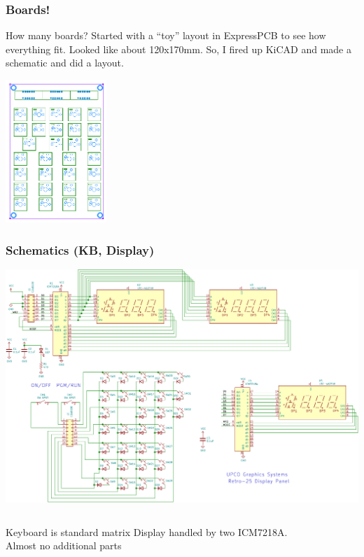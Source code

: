 \documentclass{beamer}
\newcommand{\tred}[1]{\textcolor{my-red}{#1}}
\newcommand{\tblue}[1]{\textcolor{my-blue}{#1}}
\begin{document}
\begin{frame}
  \frametitle{Boards!}

  \scriptsize
  How many boards?  Started with a ``toy'' layout in ExpressPCB to
  see how everything fit.  Looked like about 120x170mm.  So, I fired
  up KiCAD and made a schematic and did a layout.

  \vskip 0.15in

  \includegraphics[width=1.5in]{figs/sample_epcb.png}

\end{frame}


\begin{frame}
  \frametitle{Schematics (KB, Display)}  

  \vskip -0.2in
  \includegraphics[width=\textwidth]{figs/led-display-crop.pdf}

  \scriptsize
  \begin{columns}
  \tblue{Keyboard is standard matrix}
  \tred{Display handled by two ICM7218A.  \\ Almost no additional parts}
  \end{columns}
\end{frame}
\end{document}
